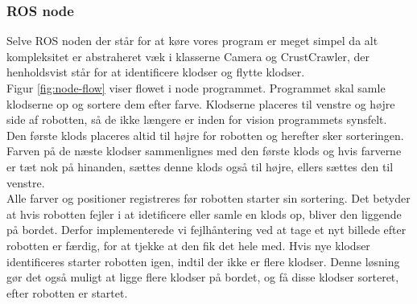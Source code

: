 \subsubsection{ROS node}
Selve ROS noden der står for at køre vores program er meget simpel da alt kompleksitet er abstraheret væk i klasserne Camera og CrustCrawler, der henholdsvist står for at identificere klodser og flytte klodser. \\

Figur \ref{fig:node-flow} viser flowet i node programmet.
Programmet skal samle klodserne op og sortere dem efter farve.
Klodserne placeres til venstre og højre side af robotten, så de ikke længere er inden for vision programmets synsfelt. \\

Den første klods placeres altid til højre for robotten og herefter sker sorteringen.
Farven på de næste klodser sammenlignes med den første klods og hvis farverne er tæt nok på hinanden, sættes denne klods også til højre, ellers sættes den til venstre. \\

Alle farver og positioner registreres før robotten starter sin sortering.
Det betyder at hvis robotten fejler i at idetificere eller samle en klods op, bliver den liggende på bordet.
Derfor implementerede vi fejlhåntering ved at tage et nyt billede efter robotten er færdig, for at tjekke at den fik det hele med.
Hvis nye klodser identificeres starter robotten igen, indtil der ikke er flere klodser.
Denne løsning gør det også muligt at ligge flere klodser på bordet, og få disse klodser sorteret, efter robotten er startet.

